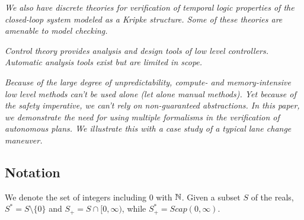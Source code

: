 {\it We also have discrete theories for verification of temporal logic properties of the closed-loop system modeled as a Kripke structure. Some of these theories are amenable to model checking.}

{\it Control theory provides analysis and design tools of low level controllers. Automatic analysis tools exist but are limited in scope.}

{\it Because of the large degree of unpredictability, compute- and memory-intensive low level methods can't be used alone (let alone manual methods). Yet because of the safety imperative, we can't rely on non-guaranteed abstractions.  In this paper, we demonstrate the need for using multiple formalisms in the verification of autonomous plans. We illustrate this with a case study of a typical lane change maneuver.}

%
%
%
%

\subsection{Notation}
We denote the set of integers including 0 with $\mathbb{N}$. 
Given a subset $S$ of the reals, $S^* = S \setminus \{0\}$ and $S_+ = S \cap [0,\infty)$,
while $S_+^* = S cap (0,\infty)$.